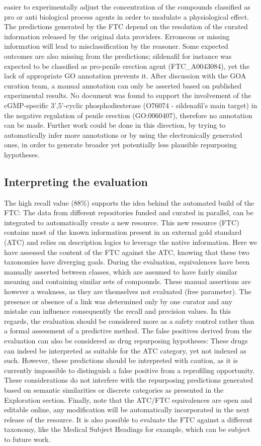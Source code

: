\documentclass{bioinfo}
\begin{document}
easier to experimentally adjust the concentration of the compounds classified as pro or anti biological process agents 
in order to modulate a physiological effect.
The predictions generated by the FTC depend on the resolution of the curated information released by 
the original data providers. Erroneous or missing information will lead to misclassification by the reasoner. 
Some expected outcomes are also missing from the predictions; sildenafil for instance was expected to be classified 
as pro-penile erection agent (FTC\_A0043084), yet the lack of appropriate GO annotation prevents it. After discussion 
with the GOA curation team, a manual annotation can only be asserted based on published experimental results. No document 
was found to support the involvement of the cGMP-specific 3',5'-cyclic phosphodiesterase (O76074 - sildenafil’s main target) 
in the negative regulation of penile erection (GO:0060407), therefore no annotation can be made. Further work could be done 
in this direction, by trying to automatically infer more annotations or by using the electronically generated ones, in order 
to generate broader yet potentially less plausible repurposing hypotheses.

\subsection{Interpreting the evaluation}
The high recall value (88\%) supports the idea behind the automated build of the FTC: The data from different 
repositories funded and curated in parallel, can be integrated to automatically create a new resource. This new resource (FTC) 
contains most of the known information present in an external gold standard (ATC) and relies on description logics to 
leverage the native information. Here we have assessed the content of the FTC against the ATC, knowing that these two 
taxonomies have diverging goals. During the evaluation, equivalences have been manually asserted between classes, 
which are assumed to have fairly similar meaning and containing similar sets of compounds. These manual assertions 
are however a weakness, as they are themselves not evaluated (free parameter). The presence or absence of a link was 
determined only by one curator and any mistake can influence consequently the recall and precision values. In this regards, 
the evaluation should be considered more as a safety control rather than a formal assessment of a predictive method.
The false positives derived from the evaluation can also be considered as drug repurposing hypotheses: These drugs 
can indeed be interpreted as suitable for the ATC category, yet not indexed as such. However, these predictions 
should be interpreted with caution, as it is currently impossible to distinguish a false positive from a 
reprofiling opportunity. These considerations do not interfere with the repurposing predictions generated 
based on semantic similarities or discrete categories as presented in the Exploration section. Finally, 
note that the ATC/FTC equivalences are open and editable online, any modification will be automatically 
incorporated in the next release of the resource. It is also possible to evaluate the FTC against a different 
taxonomy, like the Medical Subject Headings for example, which can be subject to future work.
\end{document}
